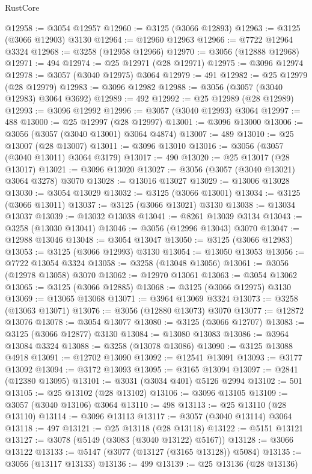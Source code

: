 \begin{lexlean}{RustCore}
\begin{coremodule}
@12958 := @3054 @12957
@12960 := @3125 (@3066 @12893)
@12963 := @3125 (@3066 @12903) @3130
@12964 := @12960 @12963
@12966 := @7722 @12964 @3324
@12968 := @3258 (@12958 @12966)
@12970 := @3056 (@12888 @12968)
@12971 := 494
@12974 := @25 @12971 (@28 @12971)
@12975 := @3096 @12974
@12978 := @3057 (@3040 @12975) @3064
@12979 := 491
@12982 := @25 @12979 (@28 @12979)
@12983 := @3096 @12982
@12988 := @3056 (@3057 (@3040 @12983) @3064 @3692)
@12989 := 492
@12992 := @25 @12989 (@28 @12989)
@12993 := @3096 @12992
@12996 := @3057 (@3040 @12993) @3064
@12997 := 488
@13000 := @25 @12997 (@28 @12997)
@13001 := @3096 @13000
@13006 := @3056 (@3057 (@3040 @13001) @3064 @4874)
@13007 := 489
@13010 := @25 @13007 (@28 @13007)
@13011 := @3096 @13010
@13016 := @3056 (@3057 (@3040 @13011) @3064 @3179)
@13017 := 490
@13020 := @25 @13017 (@28 @13017)
@13021 := @3096 @13020
@13027 := @3056 (@3057 (@3040 @13021) @3064 @3278) @3070
@13028 := @13016 @13027
@13029 := @13006 @13028
@13030 := @3054 @13029
@13032 := @3125 (@3066 @13001)
@13034 := @3125 (@3066 @13011)
@13037 := @3125 (@3066 @13021) @3130
@13038 := @13034 @13037
@13039 := @13032 @13038
@13041 := @8261 @13039 @3134
@13043 := @3258 (@13030 @13041)
@13046 := @3056 (@12996 @13043) @3070
@13047 := @12988 @13046
@13048 := @3054 @13047
@13050 := @3125 (@3066 @12983)
@13053 := @3125 (@3066 @12993) @3130
@13054 := @13050 @13053
@13056 := @7722 @13054 @3324
@13058 := @3258 (@13048 @13056)
@13061 := @3056 (@12978 @13058) @3070
@13062 := @12970 @13061
@13063 := @3054 @13062
@13065 := @3125 (@3066 @12885)
@13068 := @3125 (@3066 @12975) @3130
@13069 := @13065 @13068
@13071 := @3964 @13069 @3324
@13073 := @3258 (@13063 @13071)
@13076 := @3056 (@12880 @13073) @3070
@13077 := @12872 @13076
@13078 := @3054 @13077
@13080 := @3125 (@3066 @12707)
@13083 := @3125 (@3066 @12877) @3130
@13084 := @13080 @13083
@13086 := @3964 @13084 @3324
@13088 := @3258 (@13078 @13086)
@13090 := @3125 @13088 @4918
@13091 := @12702 @13090
@13092 := @12541 @13091
@13093 := @3177 @13092
@13094 := @3172 @13093
@13095 := @3165 @13094
@13097 := @2841 (@12380 @13095)
@13101 := @3031 (@3034 @401) @5126 @2994
@13102 := 501
@13105 := @25 @13102 (@28 @13102)
@13106 := @3096 @13105
@13109 := @3057 (@3040 @13106) @3064
@13110 := 498
@13113 := @25 @13110 (@28 @13110)
@13114 := @3096 @13113
@13117 := @3057 (@3040 @13114) @3064
@13118 := 497
@13121 := @25 @13118 (@28 @13118)
@13122 := @5151 @13121
@13127 := @3078 (@5149 (@3083 (@3040 @13122) @5167))
@13128 := @3066 @13122
@13133 := @5147 (@3077 (@13127 (@3165 @13128)) @5084)
@13135 := @3056 (@13117 @13133)
@13136 := 499
@13139 := @25 @13136 (@28 @13136)

\end{coremodule}
\end{lexlean}
